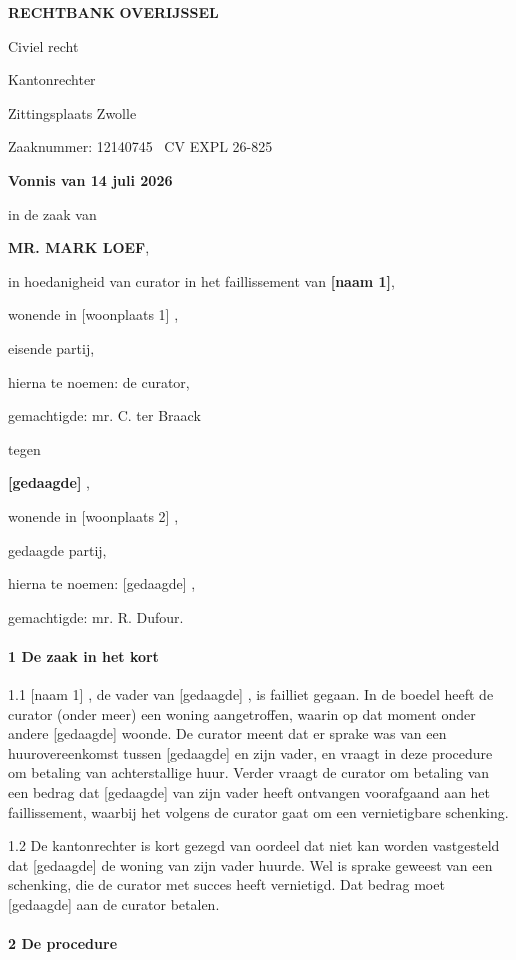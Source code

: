 \documentclass[
  dutch,
  a4paper,
]{article}
\begin{document}
\textbf{RECHTBANK}
\textbf{OVERIJSSEL}

Civiel recht

Kantonrechter

Zittingsplaats Zwolle

Zaaknummer: 12140745 ~CV EXPL 26-825

\textbf{Vonnis van 14 juli 2026}

in de zaak van

\textbf{MR. MARK LOEF},

in hoedanigheid van curator in het faillissement van \textbf{{[}naam 1{]}},

wonende in {[}woonplaats 1{]} ,

eisende partij,

hierna te noemen: de curator,

gemachtigde: mr. C. ter Braack

tegen

\textbf{{[}gedaagde{]}}
,

wonende in {[}woonplaats 2{]} ,

gedaagde partij,

hierna te noemen: {[}gedaagde{]} ,

gemachtigde: mr. R. Dufour.

\paragraph{1 De zaak in het kort}\label{de-zaak-in-het-kort}

1.1 {[}naam 1{]} , de vader van {[}gedaagde{]} , is failliet gegaan. In de boedel heeft de curator (onder meer) een woning aangetroffen, waarin op dat moment onder andere {[}gedaagde{]} woonde. De curator meent dat er sprake was van een huurovereenkomst tussen {[}gedaagde{]} en zijn vader, en vraagt in deze procedure om betaling van achterstallige huur. Verder vraagt de curator om betaling van een bedrag dat {[}gedaagde{]} van zijn vader heeft ontvangen voorafgaand aan het faillissement, waarbij het volgens de curator gaat om een vernietigbare schenking.

1.2 De kantonrechter is kort gezegd van oordeel dat niet kan worden vastgesteld dat {[}gedaagde{]} de woning van zijn vader huurde. Wel is sprake geweest van een schenking, die de curator met succes heeft vernietigd. Dat bedrag moet {[}gedaagde{]} aan de curator betalen.

\paragraph{2 De procedure}\label{de-procedure}
\end{document}
